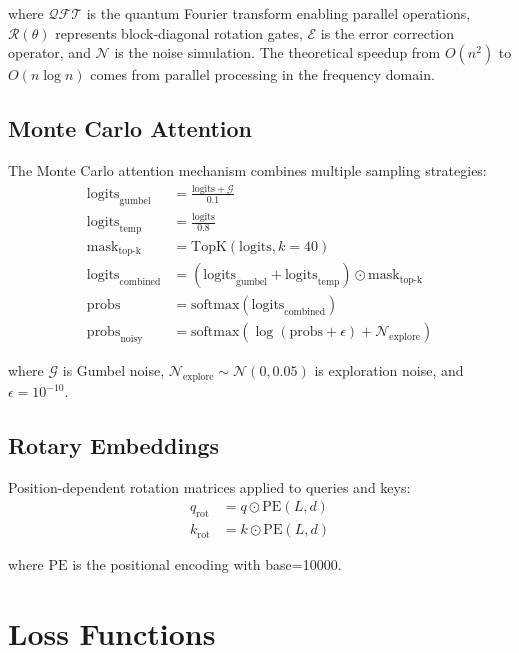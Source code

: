 \documentclass{article}
\begin{document}
where $\mathcal{QFT}$ is the quantum Fourier transform enabling parallel operations, $\mathcal{R}(\theta)$ represents block-diagonal rotation gates, $\mathcal{E}$ is the error correction operator, and $\mathcal{N}$ is the noise simulation. The theoretical speedup from $O(n^2)$ to $O(n\log n)$ comes from parallel processing in the frequency domain.

\subsection{Monte Carlo Attention}
The Monte Carlo attention mechanism combines multiple sampling strategies:
\begin{align*}
\text{logits}_{\text{gumbel}} &= \frac{\text{logits} + \mathcal{G}}{0.1} \\
\text{logits}_{\text{temp}} &= \frac{\text{logits}}{0.8} \\
\text{mask}_{\text{top-k}} &= \text{TopK}(\text{logits}, k=40) \\
\text{logits}_{\text{combined}} &= (\text{logits}_{\text{gumbel}} + \text{logits}_{\text{temp}}) \odot \text{mask}_{\text{top-k}} \\
\text{probs} &= \text{softmax}(\text{logits}_{\text{combined}}) \\
\text{probs}_{\text{noisy}} &= \text{softmax}(\log(\text{probs} + \epsilon) + \mathcal{N}_{\text{explore}})
\end{align*}

where $\mathcal{G}$ is Gumbel noise, $\mathcal{N}_{\text{explore}} \sim \mathcal{N}(0, 0.05)$ is exploration noise, and $\epsilon=10^{-10}$.

\subsection{Rotary Embeddings}
Position-dependent rotation matrices applied to queries and keys:
\begin{equation}
\begin{split}
q_{\text{rot}} &= q \odot \text{PE}(L,d) \\
k_{\text{rot}} &= k \odot \text{PE}(L,d)
\end{split}
\end{equation}

where $\text{PE}$ is the positional encoding with base=10000.

\section{Loss Functions}
\end{document}
